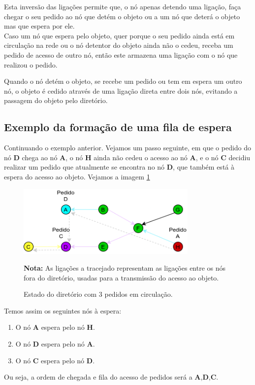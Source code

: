 Esta inversão das ligações permite que, o nó apenas detendo uma ligação, faça chegar o seu pedido ao nó que detém o objeto ou a um nó que deterá o objeto mas que espera por ele. \\




Caso um nó que espera pelo objeto, quer porque o seu pedido ainda está em circulação na rede ou o nó detentor do objeto ainda não o cedeu, receba um pedido de acesso de outro nó, então este armazena uma ligação com o nó que realizou o pedido.

Quando o nó detém o objeto, se recebe um pedido ou tem em espera um outro nó, o objeto é cedido através de uma ligação direta entre dois nós, evitando a passagem do objeto pelo diretório.


\subsection*{Exemplo da formação de uma fila de espera}

Continuando o exemplo anterior. Vejamos um passo seguinte, em que o pedido do nó \textbf{D} chega ao nó \textbf{A}, o nó \textbf{H} ainda não cedeu o acesso ao nó \textbf{A}, e o nó \textbf{C} decidiu realizar um pedido que atualmente se encontra no nó \textbf{D}, que também está à espera do acesso ao objeto. Vejamos a imagem \ref{motivacao:img:3_pedidos}

\begin{figure}[!htb]
\centering
\includegraphics[width=250pt]{fila.png}
\caption{Estado do diretório com 3 pedidos em circulação.}
\label{motivacao:img:3_pedidos}
\textbf{Nota:} As ligações a tracejado representam as ligações entre os nós fora do diretório, usadas para a transmissão do acesso ao objeto.
\end{figure}


Temos assim os seguintes nós à espera:
\begin{enumerate}
    \item O nó \textbf{A} espera pelo nó \textbf{H}.
    \item O nó \textbf{D} espera pelo nó \textbf{A}.
    \item O nó \textbf{C} espera pelo nó \textbf{D}.
\end{enumerate}
Ou seja, a ordem de chegada e fila do acesso de pedidos será a \textbf{A},\textbf{D},\textbf{C}. \\


